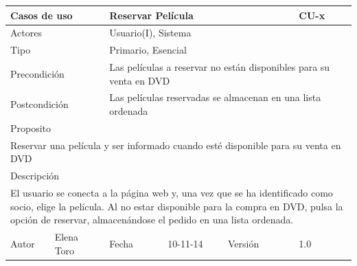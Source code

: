 \documentclass{article}
\begin{document}
\begin{table}[ht]
\begin{tabular}{|l|l|l|l|l|l|}
\hline
\multicolumn{2}{|p{2cm}|}{Casos de uso}  & \multicolumn{3}{p{7cm}|}{Reservar Película} & CU-x \\
\hline
\multicolumn{2}{|p{2cm}|}{Actores}       & \multicolumn{4}{p{8cm}|}{Usuario(I), Sistema}        \\
\hline
\multicolumn{2}{|p{2cm}|}{Tipo}          & \multicolumn{4}{p{8cm}|}{Primario, Esencial}        \\
\hline
\multicolumn{2}{|p{2cm}|}{Precondición}  & \multicolumn{4}{p{8cm}|}{Las películas a reservar no están disponibles para su venta en DVD}        \\
\hline
\multicolumn{2}{|p{2cm}|}{Postcondición} & \multicolumn{4}{p{8cm}|}{Las películas reservadas se almacenan en una lista ordenada}        \\
\hline
\multicolumn{6}{|p{10cm}|}{Proposito}                                   \\
\hline
\multicolumn{6}{|p{10cm}|}{Reservar una película y ser informado cuando esté disponible para su venta en DVD}                                            \\
\hline
\multicolumn{6}{|p{10cm}|}{Descripción}                                 \\
\hline
\multicolumn{6}{|p{10cm}|}{El usuario se conecta a la página web y, una vez que se ha identificado como socio, elige la película. Al no estar disponible para la compra en DVD, pulsa la opción de reservar, almacenándose el pedido en una lista ordenada.}                                            \\
\hline
Autor           &Elena Toro              & Fecha    &10-11-14     &   Versión  &1.0\\
\hline
\end{tabular}
\end{table}
\end{document}
